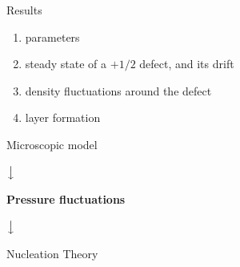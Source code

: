 \documentclass[12pt,aspectratio=169]{beamer}
\begin{document}
\begin{frame}[t]
\begin{minipage}{0.55\linewidth}
\vspace{1.2cm}
{\Large\color{bblue} Results}

\vspace{2ex}
\begin{enumerate}\setlength{\itemsep}{1.5ex}
\item parameters
\item steady state of a $+1/2$ defect, and its drift
\item density fluctuations around the defect
\item layer formation
\end{enumerate}
\end{minipage}%
\hfill%
\begin{minipage}{0.4\linewidth}
{\centering

\vspace{1.9cm}
{\color{bblue}Microscopic model {\Large \checkmark}}

\vspace{0.5cm}
$\big\downarrow$

\vspace{0.5cm}
{\color{darkred}\textbf{Pressure fluctuations}}

\vspace{0.5cm}
$\big\downarrow$

\vspace{0.5cm}
{\color{darkgreen}Nucleation Theory {\Large \checkmark}}
}
\end{minipage}%
\end{frame}
\end{document}
